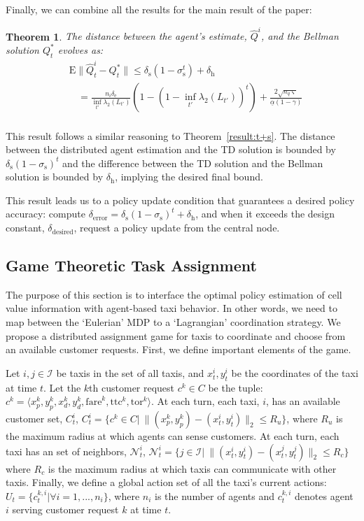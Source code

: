 \documentclass[journal]{IEEEtran}
\newtheorem{theorem}{Theorem}
\newcommand{\ttc}{\mathrm{ttc}}
\newcommand{\tor}{\mathrm{tor}}
\newcommand{\E}{\mathrm{E}}
\begin{document}
Finally, we can combine all the results for the main result of the paper:
\begin{theorem}
    \label{result:policy_update}
    The distance between the agent's estimate, $\hat{Q}^i$, and the Bellman solution $Q^{*}_t$ evolves as: 
    \begin{align*}
        &\E \| \hat{Q}^i_t - Q^*_t \| \leq \delta_\mathrm{s}( 1 - \sigma_\mathrm{s}^t) + \delta_\mathrm{h} \\ 
        & \ \ \ \ = \frac{ n_i \delta_\mathrm{e}}{ \inf_{t'} \lambda_2(L_{t'})} ( 1 - (1 - \inf_{t'} \lambda_2(L_{t'}))^t) + \frac{ 2 \sqrt{n_q \varsigma}}{ \underline{\alpha}(1-\gamma)} \\
    \end{align*}
\end{theorem}
\begin{IEEEproof}
    \label{proof:update}
    This result follows a similar reasoning to Theorem~\ref{result:t+s}. The distance between the distributed agent estimation and the TD solution is bounded by $\delta_\mathrm{s}(1-\sigma_\mathrm{s})^t$ and the difference between the TD solution and the Bellman solution is bounded by $\delta_\mathrm{h}$, implying the desired final bound. 
\end{IEEEproof}
This result leads us to a policy update condition that guarantees a desired policy accuracy: compute $\delta_\mathrm{error} = \delta_\mathrm{s}(1-\sigma_\mathrm{s})^t + \delta_\mathrm{h}$, and when it exceeds the design constant, $\delta_\mathrm{desired}$, request a policy update from the central node.

\subsection{Game Theoretic Task Assignment} 
\label{sec_game}
The purpose of this section is to interface the optimal policy estimation of cell value information with agent-based taxi behavior. In other words, we need to map between the `Eulerian' MDP to a `Lagrangian' coordination strategy. We propose a distributed assignment game for taxis to coordinate and choose from an available customer requests. First, we define important elements of the game. 

Let $i,j \in \mathcal{I}$ be taxis in the set of all taxis, and $x_t^i, y_t^i$ be the coordinates of the taxi at time $t$. Let the $k$th customer request $c^k \in C$ be the tuple: $c^k = \langle x^k_p, y^k_p, x^k_d, y^k_d, \mathrm{fare}^k, \ttc^k, \tor^k \rangle$.
At each turn, each taxi, $i$, has an available customer set, $C^i_t$, $C^i_t = \{ c^k \in C | \: \| (x^k_p, y^k_p) - (x_t^i, y_t^i) \|_2 \leq R_u \}$, where $R_u$ is the maximum radius at which agents can sense customers. 
At each turn, each taxi has an set of neighbors, $\mathcal{N}^i_t$, $\mathcal{N}^i_t = \{ j \in \mathcal{I} | \: \| (x_t^i, y_t^i) - (x_t^j, y_t^j)\|_2 \leq R_c \}$ where $R_c$ is the maximum radius at which taxis can communicate with other taxis. 
Finally, we define a global action set of all the taxi's current actions: $U_t = \{ c^{k,i}_t | \forall i = 1,...,n_i \}$, where $n_i$ is the number of agents and $c^{k,i}_t$ denotes agent $i$ serving customer request $k$ at time $t$. 
\end{document}

